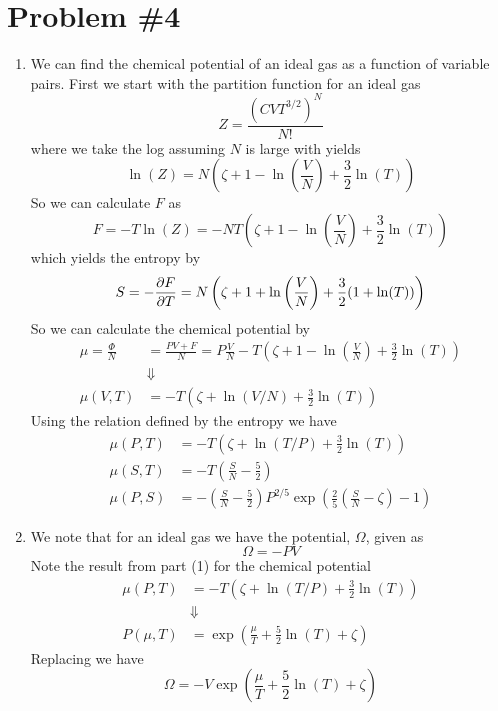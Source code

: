 \documentclass[11pt]{article}
\numberwithin{equation}{section}
\begin{document}
\section{Problem \#4}
\begin{enumerate}[(1)]
\item We can find the chemical potential of an ideal gas as a function of variable pairs. 
First we start with the partition function for an ideal gas
$$Z = \frac{(CVT^{3/2})^N}{N!}$$
where we take the log assuming $N$ is large with yields
$$\ln(Z) = N\left(\zeta+1-\ln\left(\frac{V}{N}\right)+\frac{3}{2}\ln(T)\right)$$
So we can calculate $F$ as
$$F = -T\ln(Z) = -NT\left(\zeta+1-\ln\left(\frac{V}{N}\right)+\frac{3}{2}\ln(T)\right)$$
which yields the entropy by
$$S = -\frac{\partial{F}}{\partial{T}} = N\left(\zeta+1+\ln\left(\frac{V}{N}\right) + \frac{3}{2}(1+\ln(T))\right)$$
So we can calculate the chemical potential by
\begin{align*}
\mu = \frac{\Phi}{N} &= \frac{PV+F}{N} = P\frac{V}{N} - T\left(\zeta+1-\ln\left(\frac{V}{N}\right)+\frac{3}{2}\ln(T)\right)\\
&\Downarrow\\
\mu(V,T) &= -T\left(\zeta+\ln(V/N)+\frac{3}{2}\ln(T)\right)
\end{align*}
Using the relation defined by the entropy we have
\begin{align*}
\mu(P,T) &= -T\left(\zeta+\ln(T/P)+\frac{3}{2}\ln(T)\right)\\
\mu(S,T) &= -T\left(\frac{S}{N}-\frac{5}{2}\right)\\
\mu(P,S) &= -\left(\frac{S}{N}-\frac{5}{2}\right)P^{2/5}\exp\left(\frac{2}{5}\left(\frac{S}{N}-\zeta\right)-1\right)
\end{align*}

\item We note that for an ideal gas we have the potential, $\Omega$, given as
$$\Omega = -PV$$
Note the result from part (1) for the chemical potential 
\begin{align*}
\mu(P,T) &= -T\left(\zeta+\ln(T/P)+\frac{3}{2}\ln(T)\right)\\
&\Downarrow\\
P(\mu,T) &= \exp\left(\frac{\mu}{T}+\frac{5}{2}\ln(T)+\zeta\right)
\end{align*}
Replacing we have
$$\Omega = -V\exp\left(\frac{\mu}{T}+\frac{5}{2}\ln(T)+\zeta\right)$$



\end{enumerate}
\end{document}
